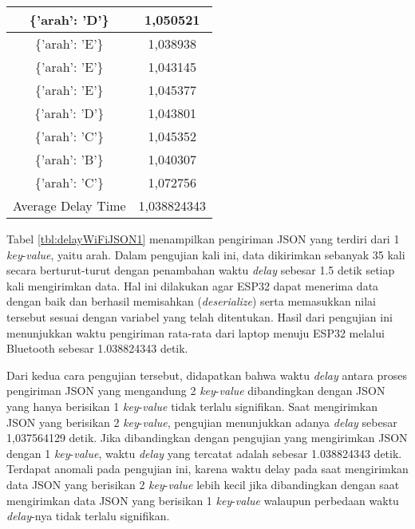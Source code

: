 \begin{table}[!h]
\begin{tabular}{|c|c|}
  \{'arah': 'D'\}    & 1,050521    \\ \hline
  \{'arah': 'E'\}    & 1,038938    \\ \hline
  \{'arah': 'E'\}    & 1,043145    \\ \hline
  \{'arah': 'E'\}    & 1,045377    \\ \hline
  \{'arah': 'D'\}    & 1,043801    \\ \hline
  \{'arah': 'C'\}    & 1,045352    \\ \hline
  \{'arah': 'B'\}    & 1,040307    \\ \hline
  \{'arah': 'C'\}    & 1,072756    \\ \hline
  Average Delay Time & 1,038824343 \\ \hline
  \end{tabular}
\end{table}

Tabel \ref{tbl:delayWiFiJSON1} menampilkan pengiriman JSON yang terdiri dari 1 \emph{key}-\emph{value}, yaitu arah. Dalam pengujian kali ini, data dikirimkan sebanyak 35 kali secara berturut-turut dengan penambahan waktu \emph{delay} sebesar 1.5 detik setiap kali mengirimkan data. Hal ini dilakukan agar ESP32 dapat menerima data dengan baik dan berhasil memisahkan (\emph{deserialize}) serta memasukkan nilai tersebut sesuai dengan variabel yang telah ditentukan. Hasil dari pengujian ini menunjukkan waktu pengiriman rata-rata dari laptop menuju ESP32 melalui Bluetooth sebesar 1.038824343 detik.

Dari kedua cara pengujian tersebut, didapatkan bahwa waktu \emph{delay} antara proses pengiriman JSON yang mengandung 2 \emph{key}-\emph{value} dibandingkan dengan JSON yang hanya berisikan 1 \emph{key}-\emph{value} tidak terlalu signifikan. Saat mengirimkan JSON yang berisikan 2 \emph{key}-\emph{value}, pengujian menunjukkan adanya \emph{delay} sebesar 1,037564129 detik. Jika dibandingkan dengan pengujian yang mengirimkan JSON dengan 1 \emph{key}-\emph{value}, waktu \emph{delay} yang tercatat adalah sebesar 1.038824343 detik. Terdapat anomali pada pengujian ini, karena waktu delay pada saat mengirimkan data JSON yang berisikan 2 \emph{key}-\emph{value} lebih kecil jika dibandingkan dengan saat mengirimkan data JSON yang berisikan 1 \emph{key}-\emph{value} walaupun perbedaan waktu \emph{delay}-nya tidak terlalu signifikan.
